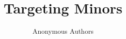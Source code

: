 \documentclass[letterpaper,twocolumn,10pt]{article}
\begin{document}
\date{}

\title{\Large \bf Targeting Minors}




\author{
  {\rm Anonymous Authors}\\
}

\maketitle

\begin{abstract}

\end{abstract}













\balance




\appendix
\onecolumn



\end{document}
